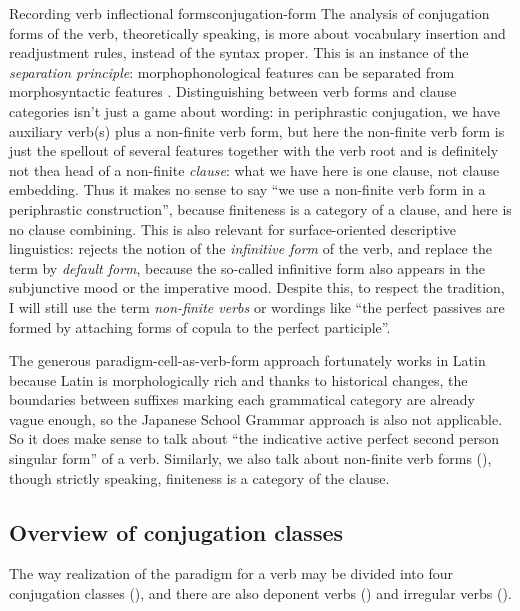\documentclass[a4paper, oneside]{report}
\newcommand*{\citepage}[1]{p.~{#1}}
\newcommand*{\term}[1]{\emph{#1}}
\begin{document}
\begin{infobox}{Recording verb inflectional forms}{conjugation-form}
    The analysis of conjugation forms of the verb, theoretically speaking,
    is more about vocabulary insertion and readjustment rules,
    instead of the syntax proper.
    This is an instance of the \emph{separation principle}:
    morphophonological features can be separated from morphosyntactic features
    \citep{embick2000features}.
    Distinguishing between verb forms and clause categories isn't just a game about wording:
    in periphrastic conjugation,
    we have auxiliary verb(s) plus a non-finite verb form,
    but here the non-finite verb form is just the spellout of several features together with the verb root 
    and is definitely not thea head of a non-finite \emph{clause}:
    what we have here is one clause, not clause embedding.
    Thus it makes no sense to say ``we use a non-finite verb form in a periphrastic construction'',
    because finiteness is a category of a clause,
    and here is no clause combining.
    This is also relevant for surface-oriented descriptive linguistics:
    \citet[\citepage{74,83}]{cgel} rejects the notion of the \term{infinitive form} of the verb,
    and replace the term by \term{default form},
    because the so-called infinitive form also appears in the subjunctive mood
    or the imperative mood. 
    Despite this, to respect the tradition, 
    I will still use the term \term{non-finite verbs} 
    or wordings like ``the perfect passives are formed by attaching forms of copula to the perfect participle''.

    The generous paradigm-cell-as-verb-form approach fortunately works in Latin 
    because Latin is morphologically rich
    and thanks to historical changes,
    the boundaries between suffixes marking each grammatical category 
    are already vague enough, so the Japanese School Grammar approach is also not applicable. 
    So it does make sense to talk about 
    ``the indicative active perfect second person singular form'' of a verb.
    Similarly, we also talk about non-finite verb forms (),
    though strictly speaking, finiteness is a category of the clause.
\end{infobox}

\subsection{Overview of conjugation classes}

The way realization of the paradigm for a verb
may be divided into four conjugation classes (),
and there are also deponent verbs () and 
irregular verbs ().
\end{document}
